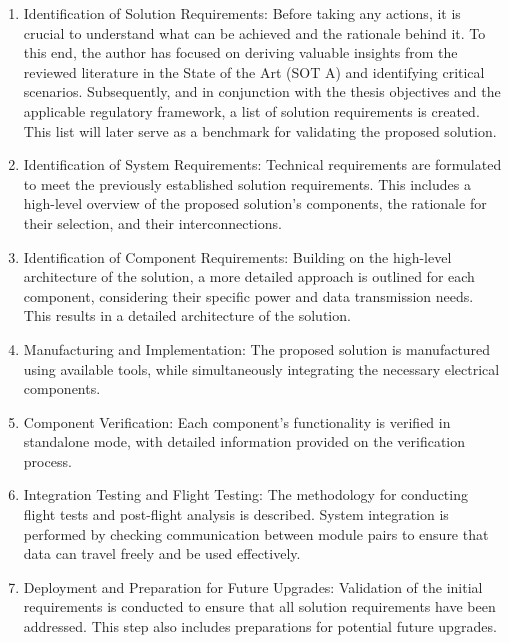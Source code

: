 \begin{enumerate}
  \item Identification of Solution Requirements: Before taking any actions, it is crucial to understand what can be achieved and the rationale behind it. To this end, the author has focused on deriving valuable insights from the reviewed literature in the State of the Art (SOT A) and identifying critical scenarios. Subsequently, and in conjunction with the thesis objectives and the applicable regulatory framework, a list of solution requirements is created. This list will later serve as a benchmark for validating the proposed solution.

  \item Identification of System Requirements: Technical requirements are formulated to meet the previously established solution requirements. This includes a high-level overview of the proposed solution’s components, the rationale for their selection, and their interconnections.

  \item Identification of Component Requirements: Building on the high-level architecture of the solution, a more detailed approach is outlined for each component, considering their specific power and data transmission needs. This results in a detailed architecture of the solution.

  \item Manufacturing and Implementation: The proposed solution is manufactured using available tools, while simultaneously integrating the necessary electrical components.

  \item Component Verification: Each component’s functionality is verified in standalone mode, with detailed information provided on the verification process.

  \item Integration Testing and Flight Testing: The methodology for conducting flight tests and post-flight analysis is described. System integration is performed by checking communication between module pairs to ensure that data can travel freely and be used effectively.

  \item Deployment and Preparation for Future Upgrades: Validation of the initial requirements is conducted to ensure that all solution requirements have been addressed. This step also includes preparations for potential future upgrades.
\end{enumerate}
